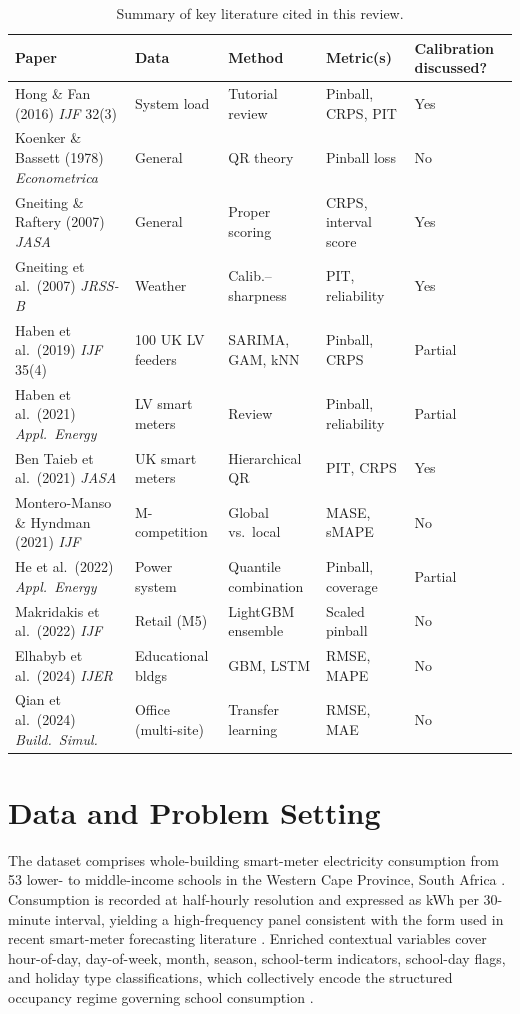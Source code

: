\documentclass[12pt,a4paper]{article}
\begin{document}
\begin{table}[H]
\centering
\caption{Summary of key literature cited in this review.}
\label{tab:litreview}
\small
\begin{tabular}{p{4.8cm} p{2.4cm} p{3.2cm} p{2.4cm} p{1.6cm}}
\toprule
\textbf{Paper} & \textbf{Data} & \textbf{Method} & \textbf{Metric(s)} & \textbf{Calibration discussed?} \\
\midrule
Hong \& Fan (2016) \textit{IJF} 32(3) & System load & Tutorial review & Pinball, CRPS, PIT & Yes \\
Koenker \& Bassett (1978) \textit{Econometrica} & General & QR theory & Pinball loss & No \\
Gneiting \& Raftery (2007) \textit{JASA} & General & Proper scoring & CRPS, interval score & Yes \\
Gneiting et al.\ (2007) \textit{JRSS-B} & Weather & Calib.--sharpness & PIT, reliability & Yes \\
Haben et al.\ (2019) \textit{IJF} 35(4) & 100 UK LV feeders & SARIMA, GAM, kNN & Pinball, CRPS & Partial \\
Haben et al.\ (2021) \textit{Appl.\ Energy} & LV smart meters & Review & Pinball, reliability & Partial \\
Ben Taieb et al.\ (2021) \textit{JASA} & UK smart meters & Hierarchical QR & PIT, CRPS & Yes \\
Montero-Manso \& Hyndman (2021) \textit{IJF} & M-competition & Global vs.\ local & MASE, sMAPE & No \\
He et al.\ (2022) \textit{Appl.\ Energy} & Power system & Quantile combination & Pinball, coverage & Partial \\
Makridakis et al.\ (2022) \textit{IJF} & Retail (M5) & LightGBM ensemble & Scaled pinball & No \\
Elhabyb et al.\ (2024) \textit{IJER} & Educational bldgs & GBM, LSTM & RMSE, MAPE & No \\
Qian et al.\ (2024) \textit{Build.\ Simul.} & Office (multi-site) & Transfer learning & RMSE, MAE & No \\
\bottomrule
\end{tabular}
\end{table}


\section{Data and Problem Setting}

The dataset comprises whole-building smart-meter electricity consumption from 53 lower- to middle-income schools in the Western Cape Province, South Africa \citep{samuels2025dataset}. Consumption is recorded at half-hourly resolution and expressed as kWh per 30-minute interval, yielding a high-frequency panel consistent with the form used in recent smart-meter forecasting literature \citep{haben2021, bentaieb2021}. Enriched contextual variables cover hour-of-day, day-of-week, month, season, school-term indicators, school-day flags, and holiday type classifications, which collectively encode the structured occupancy regime governing school consumption \citep{elhabyb2024, haben2019}.
\end{document}
